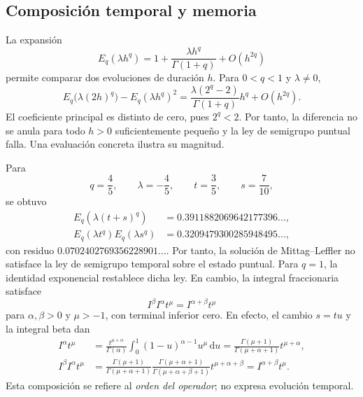 \subsection{Composición temporal y memoria}

La expansión
\[
 E_q(\lambda h^q)=1+\frac{\lambda h^q}{\Gamma(1+q)}+O(h^{2q})
\]
permite comparar dos evoluciones de duración \(h\). Para \(0<q<1\) y
\(\lambda\ne0\),
\[
 E_q\bigl(\lambda(2h)^q\bigr)-E_q(\lambda h^q)^2
 =\frac{\lambda(2^q-2)}{\Gamma(1+q)}h^q+O(h^{2q}).
\]
El coeficiente principal es distinto de cero, pues \(2^q<2\). Por tanto,
la diferencia no se anula para todo \(h>0\) suficientemente pequeño y la ley
de semigrupo puntual falla. Una evaluación concreta ilustra su magnitud.

Para
\[
 q=\frac45,\qquad \lambda=-\frac45,\qquad
 t=\frac35,\qquad s=\frac7{10},
\]
se obtuvo
\begin{align}
 E_q\!\left(\lambda(t+s)^q\right)
 &=
 0.3911882069642177396\ldots,\\
 E_q(\lambda t^q)E_q(\lambda s^q)
 &=
 0.3209479300285948495\ldots,
\end{align}
con residuo \(0.0702402769356228901\ldots\). Por tanto, la solución de Mittag--Leffler no satisface la ley de semigrupo
temporal sobre el estado puntual. Para \(q=1\), la identidad exponencial
restablece dicha ley. En cambio, la integral fraccionaria satisface
\[
 I^\beta I^\alpha t^\mu=I^{\alpha+\beta}t^\mu
\]
para \(\alpha,\beta>0\) y \(\mu>-1\), con terminal inferior cero. En efecto,
el cambio \(s=tu\) y la integral beta dan
\begin{align*}
 I^\alpha t^\mu
 &=\frac{t^{\mu+\alpha}}{\Gamma(\alpha)}
   \int_0^1(1-u)^{\alpha-1}u^\mu\,\mathrm du
 =\frac{\Gamma(\mu+1)}{\Gamma(\mu+\alpha+1)}t^{\mu+\alpha},\\
 I^\beta I^\alpha t^\mu
 &=\frac{\Gamma(\mu+1)}{\Gamma(\mu+\alpha+1)}
   \frac{\Gamma(\mu+\alpha+1)}{\Gamma(\mu+\alpha+\beta+1)}
   t^{\mu+\alpha+\beta}
 =I^{\alpha+\beta}t^\mu.
\end{align*}
Esta composición se refiere al
\emph{orden del operador}; no expresa evolución temporal.

